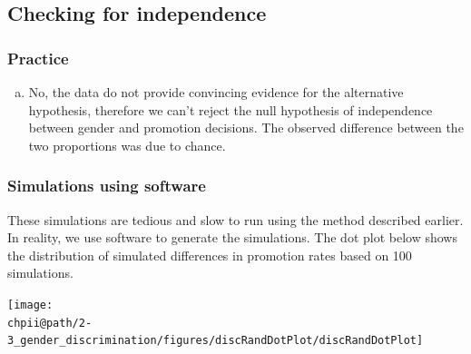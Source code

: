 \documentclass[slidestop,compress,mathserif]{beamer}
\makeatletter
\def\chpii@path{../../Chp 2}
\makeatother
\begin{document}

\subsection{Checking for independence}


\begin{frame}
\frametitle{Practice}


\begin{enumerate}[(a)]
\item No, the data do not provide convincing evidence for the alternative hypothesis, therefore we can't reject the null hypothesis of independence between gender and promotion decisions. The observed difference between the two proportions was due to chance.
\end{enumerate}

\end{frame}


\begin{frame}
\frametitle{Simulations using software}

These simulations are tedious and slow to run using the method described earlier. In reality, we use software to generate the simulations. The dot plot below shows the distribution of simulated differences in promotion rates based on 100 simulations.

\begin{center}
\texttt{[image: \\chpii@path/2-3\_gender\_discrimination/figures/discRandDotPlot/discRandDotPlot]}
\end{center}

\end{frame}


\end{document}
